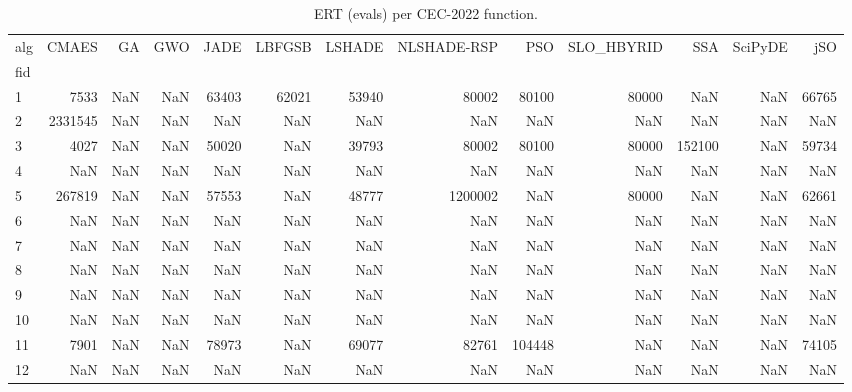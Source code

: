 \begin{table}
\caption{ERT (evals) per CEC-2022 function.}
\label{tab:ert_cec2022}
\begin{tabular}{lrrrrrrrrrrrr}
\toprule
alg & CMAES & GA & GWO & JADE & LBFGSB & LSHADE & NLSHADE-RSP & PSO & SLO_HBYRID & SSA & SciPyDE & jSO \\
fid &  &  &  &  &  &  &  &  &  &  &  &  \\
\midrule
1 & 7533 & NaN & NaN & 63403 & 62021 & 53940 & 80002 & 80100 & 80000 & NaN & NaN & 66765 \\
2 & 2331545 & NaN & NaN & NaN & NaN & NaN & NaN & NaN & NaN & NaN & NaN & NaN \\
3 & 4027 & NaN & NaN & 50020 & NaN & 39793 & 80002 & 80100 & 80000 & 152100 & NaN & 59734 \\
4 & NaN & NaN & NaN & NaN & NaN & NaN & NaN & NaN & NaN & NaN & NaN & NaN \\
5 & 267819 & NaN & NaN & 57553 & NaN & 48777 & 1200002 & NaN & 80000 & NaN & NaN & 62661 \\
6 & NaN & NaN & NaN & NaN & NaN & NaN & NaN & NaN & NaN & NaN & NaN & NaN \\
7 & NaN & NaN & NaN & NaN & NaN & NaN & NaN & NaN & NaN & NaN & NaN & NaN \\
8 & NaN & NaN & NaN & NaN & NaN & NaN & NaN & NaN & NaN & NaN & NaN & NaN \\
9 & NaN & NaN & NaN & NaN & NaN & NaN & NaN & NaN & NaN & NaN & NaN & NaN \\
10 & NaN & NaN & NaN & NaN & NaN & NaN & NaN & NaN & NaN & NaN & NaN & NaN \\
11 & 7901 & NaN & NaN & 78973 & NaN & 69077 & 82761 & 104448 & NaN & NaN & NaN & 74105 \\
12 & NaN & NaN & NaN & NaN & NaN & NaN & NaN & NaN & NaN & NaN & NaN & NaN \\
\bottomrule
\end{tabular}
\end{table}
